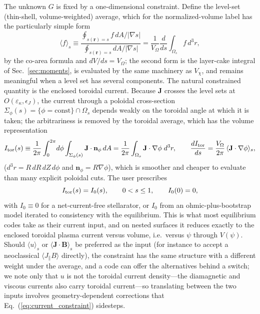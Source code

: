 \documentclass[english]{article}
\newcommand{\bB}{\mathbf{B}}
\newcommand{\bJ}{\mathbf{J}}
\newcommand{\br}{\mathbf{r}}
\newcommand{\bn}{\mathbf{n}}
\begin{document}
The unknown $G$ is fixed by a one-dimensional constraint. Define the level-set (thin-shell,
volume-weighted) average, which for the normalized-volume label has the particularly simple form
\begin{equation}
\langle f\rangle_s\equiv
\frac{\oint_{s(\br)=s}f\,dA/|\nabla s|}{\oint_{s(\br)=s}dA/|\nabla s|}
=\frac{1}{V_\Omega}\frac{d}{ds}\int_{\Omega_s}f\,d^{3}r ,
\label{eq:levelset_average}
\end{equation}
by the co-area formula and $dV/ds=V_\Omega$; the second form is the layer-cake integral of
Sec.~\ref{sec:moments}, is evaluated by the same machinery as $V_\chi$, and remains meaningful when
a level set has several components. The natural constrained quantity is the enclosed toroidal
current. Because $\bJ$ crosses the level sets at $O(\varepsilon_\kappa,\epsilon_J)$, the current
through a poloidal cross-section $\Sigma_\phi(s)=\{\phi=\mathrm{const}\}\cap\Omega_s$ depends
weakly on the toroidal angle at which it is taken; the arbitrariness is removed by the toroidal
average, which has the volume representation
\begin{equation}
I_{\rm tor}(s)\equiv\frac{1}{2\pi}\int_0^{2\pi}\!d\phi\int_{\Sigma_\phi(s)}\bJ\cdot\bn_\phi\,dA
=\frac{1}{2\pi}\int_{\Omega_s}\bJ\cdot\nabla\phi\;d^{3}r ,
\qquad
\frac{dI_{\rm tor}}{ds}=\frac{V_\Omega}{2\pi}\,\langle\bJ\cdot\nabla\phi\rangle_s ,
\label{eq:Itor}
\end{equation}
($d^3r=R\,dR\,dZ\,d\phi$ and $\bn_\phi=R\nabla\phi$), which is smoother and cheaper to evaluate
than many explicit poloidal cuts. The user prescribes
\begin{equation}
I_{\rm tor}(s)=I_0(s),\qquad 0<s\le1,\qquad I_0(0)=0 ,
\label{eq:current_constraint}
\end{equation}
with $I_0\equiv0$ for a net-current-free stellarator, or $I_0$ from an ohmic-plus-bootstrap
model iterated to consistency with the equilibrium. This is what most equilibrium codes take as
their current input, and on nested surfaces it reduces exactly to the enclosed toroidal plasma
current versus volume, i.e.\ versus $\psi$ through $V(\psi)$. Should $\langle u\rangle_s$ or
$\langle\bJ\cdot\bB\rangle_s$ be preferred as the input (for instance to accept a neoclassical
$\langle J_\parallel B\rangle$ directly), the constraint has the same structure with a different
weight under the average, and a code can offer the alternatives behind a switch; we note only that
$u$ is not the toroidal current density---the diamagnetic and viscous currents also carry
toroidal current---so translating between the two inputs involves geometry-dependent corrections
that Eq.~(\ref{eq:current_constraint}) sidesteps.
\end{document}
